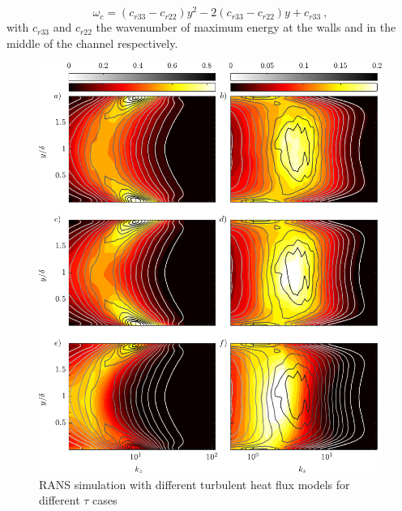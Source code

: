 \documentclass[10pt]{article}
\begin{document}
\begin{equation*}
\omega_c = (c_{r33} - c_{r22}) y^2 - 2(c_{r33} - c_{r22})y +c_{r33} \ ,
\end{equation*}
with $c_{r33}$ and $c_{r22}$ the wavenumber of maximum energy at the walls and in the middle of the channel respectively. 

\begin{figure}[htb]
\centering
\includegraphics[width=1.1\textwidth]{fig13.pdf}
\caption{\noindent RANS simulation with different turbulent heat flux models for different $\tau$ cases}
\label{spectra}
\end{figure}
\newpage
\end{document}
